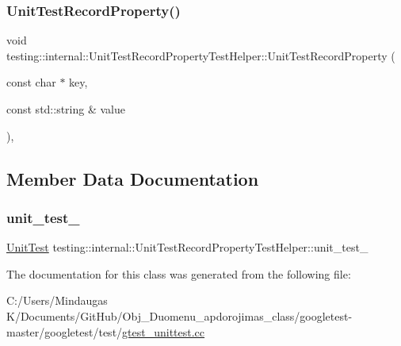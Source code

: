\subsubsection{\texorpdfstring{UnitTestRecordProperty()}{UnitTestRecordProperty()}\hspace{0.1cm}{\footnotesize\ttfamily [3/3]}}
{\footnotesize\ttfamily void testing\+::internal\+::\+Unit\+Test\+Record\+Property\+Test\+Helper\+::\+Unit\+Test\+Record\+Property (\begin{DoxyParamCaption}\item[{const char $\ast$}]{key,  }\item[{const std\+::string \&}]{value }\end{DoxyParamCaption})\hspace{0.3cm}{\ttfamily [inline]}, {\ttfamily [protected]}}



\subsection{Member Data Documentation}
\mbox{\label{classtesting_1_1internal_1_1_unit_test_record_property_test_helper_a415e13a354d3b8bd97db96aae5ef5df1}} 
\subsubsection{\texorpdfstring{unit\_test\_}{unit\_test\_}}
{\footnotesize\ttfamily \mbox{\hyperlink{classtesting_1_1_unit_test}{Unit\+Test}} testing\+::internal\+::\+Unit\+Test\+Record\+Property\+Test\+Helper\+::unit\+\_\+test\+\_\+\hspace{0.3cm}{\ttfamily [protected]}}



The documentation for this class was generated from the following file\+:\begin{DoxyCompactItemize}
\item 
C\+:/\+Users/\+Mindaugas K/\+Documents/\+Git\+Hub/\+Obj\+\_\+\+Duomenu\+\_\+apdorojimas\+\_\+class/googletest-\/master/googletest/test/\mbox{\hyperlink{googletest-master_2googletest_2test_2gtest__unittest_8cc}{gtest\+\_\+unittest.\+cc}}\end{DoxyCompactItemize}
